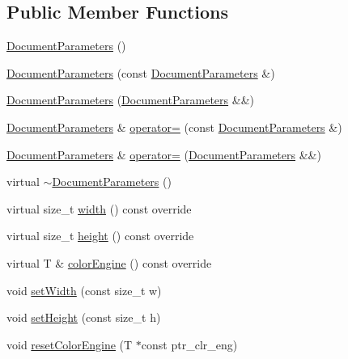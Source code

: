 \subsection*{Public Member Functions}
\begin{DoxyCompactItemize}
\item 
\hyperlink{classGraphicalEditorCore_1_1DocumentParameters_a2f886f265cbb7c548763142c05daa7f9}{Document\+Parameters} ()
\item 
\hyperlink{classGraphicalEditorCore_1_1DocumentParameters_af51920612aedf38f46b341b675f6f271}{Document\+Parameters} (const \hyperlink{classGraphicalEditorCore_1_1DocumentParameters}{Document\+Parameters} \&)
\item 
\hyperlink{classGraphicalEditorCore_1_1DocumentParameters_a3fc1cb785673903106dce2a4c6d47875}{Document\+Parameters} (\hyperlink{classGraphicalEditorCore_1_1DocumentParameters}{Document\+Parameters} \&\&)
\item 
\hyperlink{classGraphicalEditorCore_1_1DocumentParameters}{Document\+Parameters} \& \hyperlink{classGraphicalEditorCore_1_1DocumentParameters_ab4603c9baf2d76b9405fd099572546f4}{operator=} (const \hyperlink{classGraphicalEditorCore_1_1DocumentParameters}{Document\+Parameters} \&)
\item 
\hyperlink{classGraphicalEditorCore_1_1DocumentParameters}{Document\+Parameters} \& \hyperlink{classGraphicalEditorCore_1_1DocumentParameters_a635d305147d085a54281dd135601afa9}{operator=} (\hyperlink{classGraphicalEditorCore_1_1DocumentParameters}{Document\+Parameters} \&\&)
\item 
virtual \hyperlink{classGraphicalEditorCore_1_1DocumentParameters_a390ce6cb3be137d584bb7c74965325b7}{$\sim$\+Document\+Parameters} ()
\item 
virtual size\+\_\+t \hyperlink{classGraphicalEditorCore_1_1DocumentParameters_a96834b7081ba4001cf0c8a38532f3a48}{width} () const override
\item 
virtual size\+\_\+t \hyperlink{classGraphicalEditorCore_1_1DocumentParameters_ab1a929a3638767bbb361e9a7c69e9374}{height} () const override
\item 
virtual T \& \hyperlink{classGraphicalEditorCore_1_1DocumentParameters_a49010b1753c4a62a46bf01da20f17e61}{color\+Engine} () const override
\item 
void \hyperlink{classGraphicalEditorCore_1_1DocumentParameters_a1b982f66a9fd844c3ecbba465bf85ad1}{set\+Width} (const size\+\_\+t w)
\item 
void \hyperlink{classGraphicalEditorCore_1_1DocumentParameters_a399ffb889b05829955ed0ab4020408ef}{set\+Height} (const size\+\_\+t h)
\item 
void \hyperlink{classGraphicalEditorCore_1_1DocumentParameters_afdd4ea9fd33458fdfdb125b286a75344}{reset\+Color\+Engine} (T $\ast$const ptr\+\_\+clr\+\_\+eng)
\end{DoxyCompactItemize}


